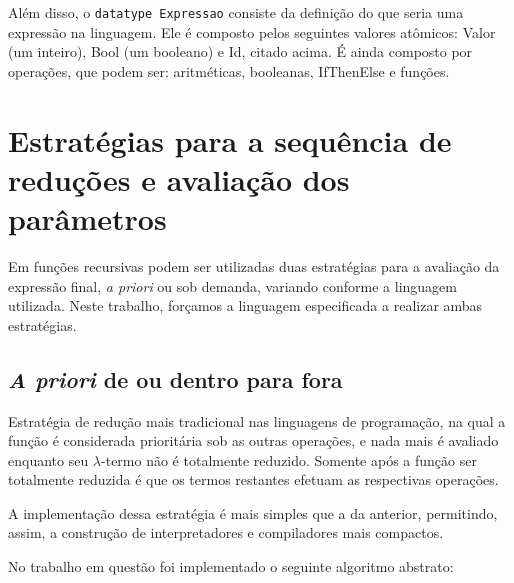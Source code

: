 \documentclass[brazil,times]{abnt}
\begin{document}
Além disso, o \texttt{datatype Expressao} consiste da definição do que seria uma expressão na linguagem. Ele é composto pelos seguintes valores atômicos: Valor (um inteiro), Bool (um booleano) e Id, citado acima. É ainda composto por operações, que podem ser: aritméticas, booleanas, IfThenElse e funções.


\chapter{Estratégias para a sequência de reduções e avaliação dos parâmetros}
Em funções recursivas podem ser utilizadas duas estratégias para a avaliação da expressão final, \textit{a priori} ou sob demanda, variando conforme a linguagem utilizada. Neste trabalho, forçamos a linguagem especificada a realizar ambas estratégias.

\section{\textit{A priori} de ou dentro para fora}
Estratégia de redução mais tradicional nas linguagens de programação, na qual a função é considerada prioritária sob as outras operações, e nada mais é avaliado enquanto seu $\lambda$-termo não é totalmente reduzido. Somente após a função ser totalmente reduzida é que os termos restantes efetuam as respectivas operações.

A implementação dessa estratégia é mais simples que a da anterior, permitindo, assim, a construção de interpretadores e compiladores mais compactos.

No trabalho em questão foi implementado o seguinte algoritmo abstrato:

\end{document}
